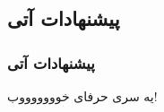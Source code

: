 \label{conclusions_and_future_works}

\subsection{پیشنهادات آتی}
\begin{frame} 
\frametitle{پیشنهادات آتی}

\pause
یه سری حرفای خوووووووب!
\end{frame}
